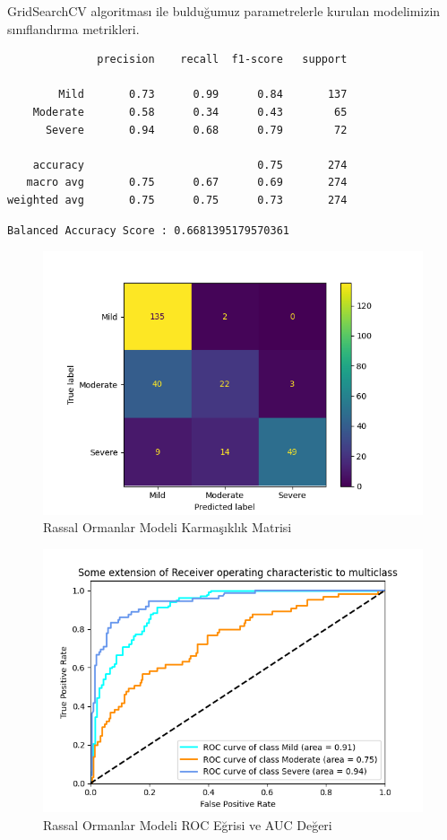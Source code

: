 \documentclass[12pt,twoside]{deuthesis}
\begin{document}
GridSearchCV algoritması ile bulduğumuz parametrelerle kurulan modelimizin sınıflandırma metrikleri.
\begin{verbatim}
              precision    recall  f1-score   support

        Mild       0.73      0.99      0.84       137
    Moderate       0.58      0.34      0.43        65
      Severe       0.94      0.68      0.79        72

    accuracy                           0.75       274
   macro avg       0.75      0.67      0.69       274
weighted avg       0.75      0.75      0.73       274
\end{verbatim}
\begin{verbatim}
Balanced Accuracy Score : 0.6681395179570361
\end{verbatim}
\begin{figure}

{\centering \includegraphics[width=1.05\linewidth,height=0.6\textheight]{figure/rfc_conf} 

}

\caption{Rassal Ormanlar Modeli Karmaşıklık Matrisi}\label{fig:unnamed-chunk-26}
\end{figure}
\begin{figure}

{\centering \includegraphics[width=1.05\linewidth,height=0.6\textheight]{figure/roc_curve_RandomForestClassifier} 

}

\caption{Rassal Ormanlar Modeli ROC Eğrisi ve AUC Değeri}\label{fig:unnamed-chunk-27}
\end{figure}
\end{document}
